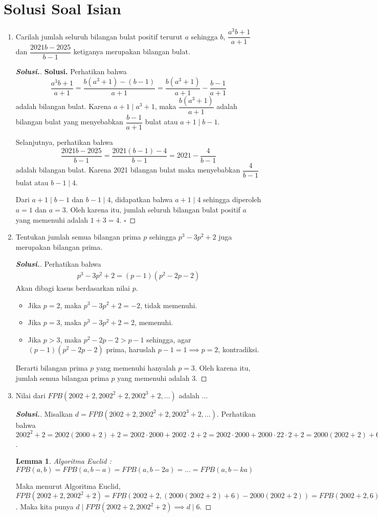 \documentclass[a4paper,12pt,bahasa]{article}
\newtheorem{lemma}{Lemma} %
\begin{document}
\section{Solusi Soal Isian}
\begin{enumerate} 
\item Carilah jumlah seluruh bilangan bulat positif terurut $a$ sehingga $b$, $\dfrac{a^3b+1}{a+1}$ dan $\dfrac{2021b-2025}{b-1}$ ketiganya merupakan bilangan bulat.

			
\begin{proof}[\textbf{Solusi.}]
\textbf{Solusi. }Perhatikan bahwa $$\dfrac{a^3b+1}{a+1}=\dfrac{b(a^3+1)-(b-1)}{a+1} =\dfrac{b(a^3+1)}{a+1}-\dfrac{b-1}{a+1}$$ adalah bilangan bulat. Karena $a+1 \mid a^3+1$, maka $\dfrac{b(a^3+1)}{a+1}$ adalah bilangan bulat yang menyebabkan $\dfrac{b-1}{a+1}$ bulat atau $a+1 \mid b-1$.
			
			Selanjutnya, perhatikan bahwa $$\dfrac{2021b-2025}{b-1}=\dfrac{2021(b-1)-4}{b-1}=2021-\dfrac{4}{b-1}$$ adalah bilangan bulat. Karena 2021 bilangan bulat maka menyebabkan $\dfrac{4}{b-1}$ bulat atau $b-1 \mid 4$. 
			
			Dari $a+1 \mid b-1$ dan $b-1 \mid 4$, didapatkan bahwa $a+1 \mid 4$ sehingga diperoleh $a=1$ dan $a=3$. Oleh karena itu, jumlah seluruh bilangan bulat positif $a$ yang memenuhi adalah $1+3=\boxed{4}$. $\square$
\end{proof}

\item  Tentukan jumlah semua bilangan prima $p$ sehingga $p^3-3p^2+2$ juga merupakan bilangan prima.
\begin{proof}[\textbf{Solusi.}] Perhatikan bahwa
\begin{align*}
p^3-3p^2+2 = (p-1)(p^2-2p-2)
\end{align*}
Akan dibagi kasus berdasarkan nilai $p$.
\begin{itemize}[]
\item Jika $p=2$, maka $p^3-3p^2+2=-2$, tidak memenuhi.
\item Jika $p=3$, maka $p^3-3p^2+2=2$, memenuhi.
\item Jika $p>3$, maka $p^2-2p-2 > p-1$ sehingga, agar $(p-1)(p^2-2p-2)$ prima, haruslah $p-1=1 \implies p=2$, kontradiksi. 
\end{itemize}
Berarti bilangan prima $p$ yang memenuhi hanyalah $p=3$. Oleh karena itu, jumlah semua bilangan prima $p$ yang memenuhi adalah $\boxed{3}$.
\end{proof}

\item Nilai dari $FPB(2002+2,2002^2+2,2002^3+2,\dots)$ adalah $\dots$
\begin{proof}[\textbf{Solusi.}]
		Misalkan $d=FPB(2002+2,2002^2+2,2002^3+2,\dots)$. Perhatikan bahwa $2002^2+2=2002(2000+2)+2=2002\cdot 2000+2002\cdot 2+2=2002\cdot 2000+2000\cdot 2 2\cdot 2+2=2000(2002+2)+6$. 
			\begin{lemma}
			Algoritma Euclid : $FPB(a,b)=FPB(a,b-a)=FPB(a,b-2a)=\dots =FPB(a,b-ka)$
			\end{lemma}
		Maka menurut Algoritma Euclid, $FPB(2002+2,2002^2+2)=FPB(2002+2,(2000(2002+2)+6)-2000(2002+2))=FPB(2002+2,6)=6$. Maka kita punya $d \mid FPB(2002+2,2002^2+2) \implies d \mid 6$. 
		

\end{proof}
\end{enumerate}
\end{document}
